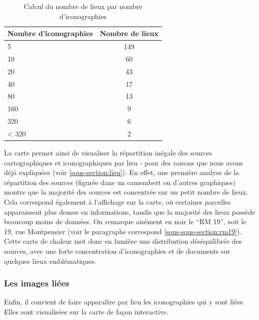 \begin{table}[!]
    \centering
    \begin{tabular}{|l|c|}
    \toprule
        \textbf{Nombre d'iconographies} & \textbf{Nombre de lieux}\\
    \midrule
         5  & 149 \\
         10 & 60 \\
         20 & 43 \\
         40 & 17 \\
         80 & 13 \\
         160 & 9 \\
         320 & 6 \\
         < 320 & 2 \\
        \bottomrule
    \end{tabular}
    \caption{Calcul du nombre de lieux par nombre d'iconographies}
    \label{tab:legende}
\end{table}
 
La carte permet ainsi de visualiser la répartition inégale des sources cartographiques et iconographiques par lieu - pour des raisons que nous avons déjà expliquées (voir \ref{sous-section:lieu}). En effet, une première analyse de la répartition des sources (figurée dans un camembert ou d'autres graphiques) montre que la majorité des sources est concentrée sur un petit nombre de lieux. Cela correspond également à l'affichage sur la carte, où certaines parcelles apparaissent plus denses en informations, tandis que la majorité des lieux possède beaucoup moins de données. On remarque aisément en noir le \enquote{RM 19}, soit le 19, rue Montpensier (voir le paragraphe correspond \ref{sous-sous-section:rm19}). Cette carte de chaleur met donc en lumière une distribution déséquilibrée des sources, avec une forte concentration d'iconographies et de documents sur quelques lieux emblématiques. 


\subsubsection{Les images liées}
Enfin, il convient de faire apparaître par lieu les iconographies qui y sont liées. Elles sont visualisées sur la carte de façon interactive. 

